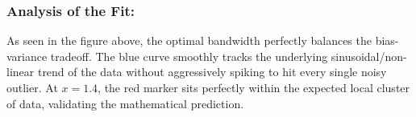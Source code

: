 \documentclass[twoside, 10pt]{article}
\begin{document}
\subsubsection{Analysis of the Fit:}
As seen in the figure above, the optimal bandwidth perfectly balances the bias-variance tradeoff. The blue curve smoothly tracks the underlying sinusoidal/non-linear trend of the data without aggressively spiking to hit every single noisy outlier. At $x = 1.4$, the red marker sits perfectly within the expected local cluster of data, validating the mathematical prediction.
\end{document}
